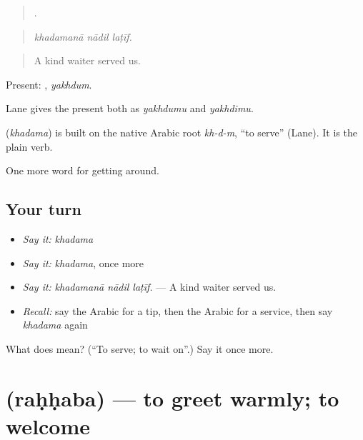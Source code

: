 \begin{quote}
  .
\end{quote}

\begin{quote}
\emph{khadamanā nādil laṭīf.}
\end{quote}

\begin{quote}
A kind waiter served us.
\end{quote}

Present: , \emph{yakhdum}.

Lane gives the present both as \emph{yakhdumu} and \emph{yakhdimu}.

\begin{cousinweb}
\textbf{} (\emph{khadama}) is built on the native Arabic root \emph{kh-d-m}, \textquotedblleft{}to serve\textquotedblright{} (Lane). It is the plain verb.
\end{cousinweb}

\begin{grammarlens}[title={What you've built}]
One more word for getting around.
\end{grammarlens}

\subsection*{Your turn}
\begin{itemize}
\raggedright
  \item \emph{Say it:} \emph{khadama}
  \item \emph{Say it:} \emph{khadama}, once more
  \item \emph{Say it:} \emph{khadamanā nādil laṭīf.} — A kind waiter served us.
  \item \emph{Recall:} say the Arabic for a tip, then the Arabic for a service, then say \emph{khadama} again
\end{itemize}

\begin{tcolorbox}[breakable,colback=teal!4,colframe=teal!35!black,title={Before you move on}]
What does  mean? (\textquotedblleft{}To serve; to wait on\textquotedblright{}.) Say it once more.
\end{tcolorbox}
\section[\texorpdfstring{\ar{رحب} (raḥḥaba)}{رحب (raḥḥaba)}]{ (raḥḥaba) — to greet warmly; to welcome}

